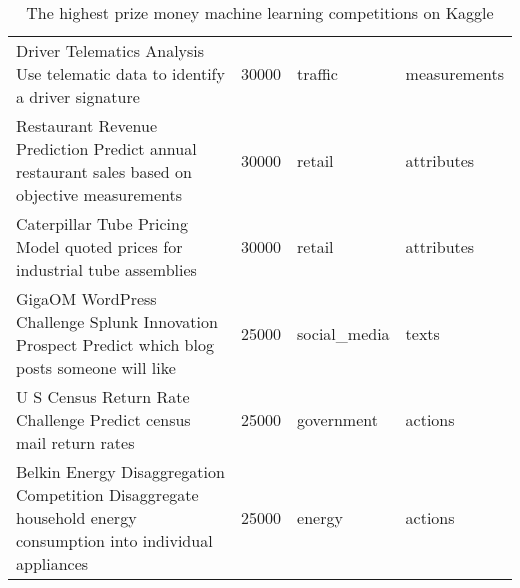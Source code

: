 \begin{table}[ht]
\begin{tabular}{p{}p{}p{}p{}}
  Driver Telematics Analysis Use telematic data to identify a driver signature & 30000 & traffic & measurements \\ 
  Restaurant Revenue Prediction Predict annual restaurant sales based on objective measurements & 30000 & retail & attributes \\ 
  Caterpillar Tube Pricing Model quoted prices for industrial tube assemblies & 30000 & retail & attributes \\ 
  GigaOM WordPress Challenge Splunk Innovation Prospect Predict which blog posts someone will like  & 25000 & social\_media & texts \\ 
  U S Census Return Rate Challenge Predict census mail return rates  & 25000 & government & actions \\ 
  Belkin Energy Disaggregation Competition Disaggregate household energy consumption into individual appliances & 25000 & energy & actions \\ 
   \hline
\end{tabular}
\endgroup
\caption{The highest prize money machine learning competitions on Kaggle} 
\label{tab:kaggle_competitions}
\end{table}
